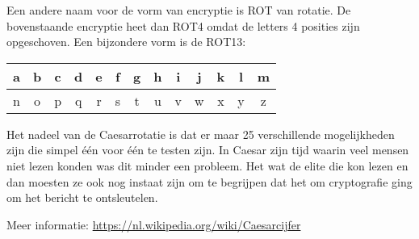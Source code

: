 Een andere naam voor de vorm van encryptie is ROT van rotatie. De bovenstaande encryptie heet dan ROT4 omdat de letters 4 posities zijn opgeschoven. Een bijzondere vorm is de ROT13:

\begin{tabular}{ | c | c | c | c | c | c | c | c | c | c | c | c | c | }
	\hline
 a & b & c & d & e & f & g & h & i & j & k & l & m \\
	\hline
 n & o & p & q & r & s & t & u & v & w & x & y & z \\
	\hline
\end{tabular}

Het nadeel van de Caesarrotatie is dat er maar 25 verschillende mogelijkheden zijn die simpel \'e\'en voor \'e\'en te testen zijn. In Caesar zijn tijd waarin veel mensen niet lezen konden was dit minder een probleem. Het wat de elite die kon lezen en dan moesten ze ook nog instaat zijn om te begrijpen dat het om cryptografie ging om het bericht te ontsleutelen.

Meer informatie: \url{https://nl.wikipedia.org/wiki/Caesarcijfer}

